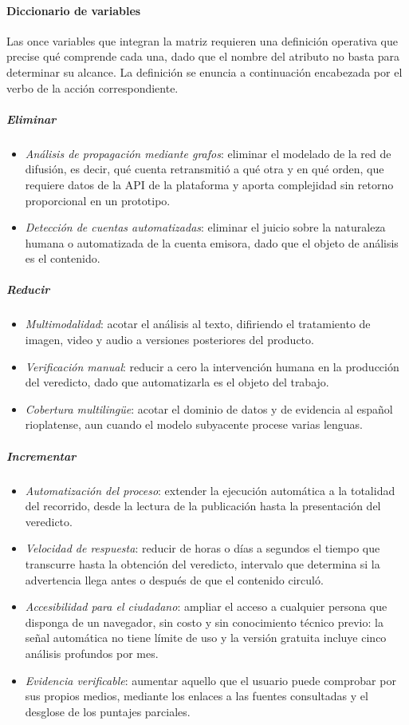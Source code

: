 \paragraph{Diccionario de variables}

Las once variables que integran la matriz requieren una definición operativa que precise qué comprende cada una, dado que el nombre del atributo no basta para determinar su alcance. La definición se enuncia a continuación encabezada por el verbo de la acción correspondiente.

\subparagraph{Eliminar}
\begin{itemize}[leftmargin=1.1cm, topsep=2pt, itemsep=2pt]
  \item \textit{Análisis de propagación mediante grafos}: eliminar el modelado de la red de difusión, es decir, qué cuenta retransmitió a qué otra y en qué orden, que requiere datos de la API de la plataforma y aporta complejidad sin retorno proporcional en un prototipo.
  \item \textit{Detección de cuentas automatizadas}: eliminar el juicio sobre la naturaleza humana o automatizada de la cuenta emisora, dado que el objeto de análisis es el contenido.
\end{itemize}

\subparagraph{Reducir}
\begin{itemize}[leftmargin=1.1cm, topsep=2pt, itemsep=2pt]
  \item \textit{Multimodalidad}: acotar el análisis al texto, difiriendo el tratamiento de imagen, video y audio a versiones posteriores del producto.
  \item \textit{Verificación manual}: reducir a cero la intervención humana en la producción del veredicto, dado que automatizarla es el objeto del trabajo.
  \item \textit{Cobertura multilingüe}: acotar el dominio de datos y de evidencia al español rioplatense, aun cuando el modelo subyacente procese varias lenguas.
\end{itemize}

\subparagraph{Incrementar}
\begin{itemize}[leftmargin=1.1cm, topsep=2pt, itemsep=2pt]
  \item \textit{Automatización del proceso}: extender la ejecución automática a la totalidad del recorrido, desde la lectura de la publicación hasta la presentación del veredicto.
  \item \textit{Velocidad de respuesta}: reducir de horas o días a segundos el tiempo que transcurre hasta la obtención del veredicto, intervalo que determina si la advertencia llega antes o después de que el contenido circuló.
  \item \textit{Accesibilidad para el ciudadano}: ampliar el acceso a cualquier persona que disponga de un navegador, sin costo y sin conocimiento técnico previo: la señal automática no tiene límite de uso y la versión gratuita incluye cinco análisis profundos por mes.
  \item \textit{Evidencia verificable}: aumentar aquello que el usuario puede comprobar por sus propios medios, mediante los enlaces a las fuentes consultadas y el desglose de los puntajes parciales.
\end{itemize}

